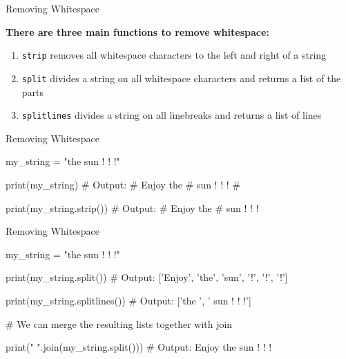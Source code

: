 \begin{frame}[fragile]{Removing Whitespace}

    \textbf{There are three main functions to remove whitespace:}

    \begin{enumerate}

    \item \texttt{strip} removes all whitespace characters to the left and right of a string
    \item \texttt{split} divides a string on all whitespace characters and returns a list of the parts
    \item \texttt{splitlines} divides a string on all linebreaks and returns a list of lines

    \end{enumerate}


\end{frame}


\begin{frame}[fragile]{Removing Whitespace}

    \begin{pythoncode}

my_string = "\tEnjoy the \n sun !  ! !\n"

print(my_string)
# Output:
#	 Enjoy the 
# sun !  ! !
# 

print(my_string.strip())
# Output:
# Enjoy the 
#  sun !  ! !

    \end{pythoncode}

\end{frame}

\begin{frame}[fragile]{Removing Whitespace}

    \begin{pythoncode}
my_string = "\tEnjoy the \n sun !  ! !\n"

print(my_string.split())
# Output: ['Enjoy', 'the', 'sun', '!', '!', '!']

print(my_string.splitlines())
# Output: ['\tEnjoy the ', ' sun !  ! !']

# We can merge the resulting lists together with join

print(" ".join(my_string.split()))
# Output: Enjoy the sun ! ! !

    \end{pythoncode}

\end{frame}



